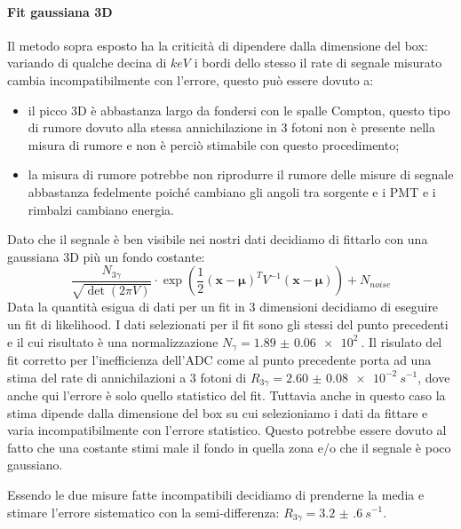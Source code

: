 \paragraph{Fit gaussiana 3D}
Il metodo sopra esposto ha la criticità di dipendere dalla dimensione del box: variando di qualche decina di $\si{keV}$ i bordi dello stesso il rate di segnale misurato cambia incompatibilmente con l'errore, questo può essere dovuto a:
\begin{itemize}
	\item il picco 3D è abbastanza largo da fondersi con le spalle Compton, questo tipo di rumore dovuto alla stessa annichilazione in 3 fotoni non è presente nella misura di rumore e non è perciò stimabile con questo procedimento;
	\item la misura di rumore potrebbe non riprodurre il rumore delle misure di segnale abbastanza fedelmente poiché cambiano gli angoli tra sorgente e i PMT e i rimbalzi cambiano energia.
\end{itemize}
Dato che il segnale è ben visibile nei nostri dati decidiamo di fittarlo con una gaussiana 3D più un fondo costante: 
\begin{equation*}
\frac{N_{3\gamma}}{\sqrt{\det(2\pi V)}} \cdot \exp ( \frac{1}{2} (\textbf{x}-\boldsymbol{\mu})^T V^{-1}( \textbf{x}-\boldsymbol{\mu} ) ) + N_{noise}
\end{equation*}
Data la quantità esigua di dati per un fit in 3 dimensioni decidiamo di eseguire un fit di likelihood. I dati selezionati per il fit sono gli stessi del punto precedenti e il cui risultato è una normalizzazione $N_{\gamma} = \SI{1.89(6)e2}{}$. Il risulato del fit corretto per l'inefficienza dell'ADC come al punto precedente porta ad una stima del rate di annichilazioni a 3 fotoni di $R_{3\gamma} = \SI{2.60(8)e-2}{s^{-1}}$, dove anche qui l'errore è solo quello statistico del fit.
Tuttavia anche in questo caso la stima dipende dalla dimensione del box su cui selezioniamo i dati da fittare e varia incompatibilmente con l'errore statistico. Questo potrebbe essere dovuto al fatto che una costante stimi male il fondo in quella zona e/o che il segnale è poco gaussiano.

Essendo le due misure fatte incompatibili decidiamo di prenderne la media e stimare l'errore sistematico con la semi-differenza: $R_{3\gamma} = \SI{3.2(6)}{s^{-1}}$.

